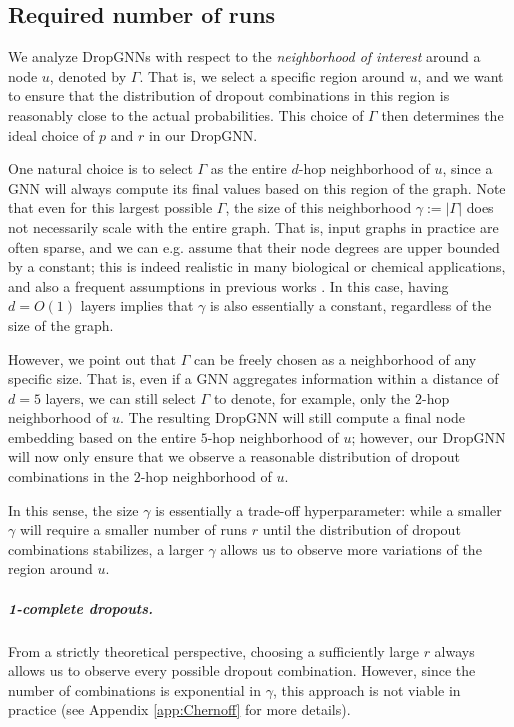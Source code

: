\documentclass{article}
\begin{document}
\subsection{Required number of runs}

We analyze DropGNNs with respect to the \textit{neighborhood of interest} around a node $u$, denoted by $\Gamma$. That is, we select a specific region around $u$, and we want to ensure that the distribution of dropout combinations in this region is reasonably close to the actual probabilities. This choice of $\Gamma$ then determines the ideal choice of $p$ and $r$ in our DropGNN.

One natural choice is to select $\Gamma$ as the entire $d$-hop neighborhood of $u$, since a GNN will always compute its final values based on this region of the graph. Note that even for this largest possible $\Gamma$, the size of this neighborhood $\gamma:=|\Gamma|$ does not necessarily scale with the entire graph. That is, input graphs in practice are often sparse, and we can e.g. assume that their node degrees are upper bounded by a constant; this is indeed realistic in many biological or chemical applications, and also a frequent assumptions in previous works \citep{ports}. In this case, having $d=O(1)$ layers implies that $\gamma$ is also essentially a constant, regardless of the size of the graph.

However, we point out that $\Gamma$ can be freely chosen as a neighborhood of any specific size. That is, even if a GNN aggregates information within a distance of $d=5$ layers, we can still select $\Gamma$ to denote, for example, only the $2$-hop neighborhood of $u$. The resulting DropGNN will still compute a final node embedding based on the entire $5$-hop neighborhood of $u$; however, our DropGNN will now only ensure that we observe a reasonable distribution of dropout combinations in the $2$-hop neighborhood of $u$.

In this sense, the size $\gamma$ is essentially a trade-off hyperparameter: while a smaller $\gamma$ will require a smaller number of runs $r$ until the distribution of dropout combinations stabilizes, a larger $\gamma$ allows us to observe more variations of the region around $u$.

\subparagraph*{1-complete dropouts.} From a strictly theoretical perspective, choosing a sufficiently large $r$ always allows us to observe every possible dropout combination. However, since the number of combinations is exponential in $\gamma$, this approach is not viable in practice (see Appendix \ref{app:Chernoff} for more details).
\end{document}
